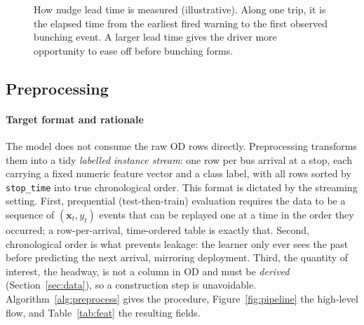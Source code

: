 \documentclass[final,5p,times,twocolumn,authoryear]{elsarticle}
\begin{document}
\begin{figure}[htbp]
\centering
{}
\caption{How nudge lead time is measured (illustrative). Along one trip, it is the elapsed time from
the earliest fired warning to the first observed bunching event. A larger lead time gives the driver
more opportunity to ease off before bunching forms.}
\label{fig:leadtime}
\end{figure}

\subsection{Preprocessing}
\label{sec:preprocessing}

\paragraph{Target format and rationale}
The model does not consume the raw OD rows directly. Preprocessing transforms them into a tidy
\emph{labelled instance stream}: one row per bus arrival at a stop, each carrying a fixed numeric
feature vector and a class label, with all rows sorted by \texttt{stop\_time} into true
chronological order. This format is dictated by the streaming setting. First, prequential
(test-then-train) evaluation requires the data to be a sequence of $(\mathbf{x}_t, y_t)$ events that
can be replayed one at a time in the order they occurred; a row-per-arrival, time-ordered table is
exactly that. Second, chronological order is what prevents leakage: the learner only ever sees the
past before predicting the next arrival, mirroring deployment. Third, the quantity of interest,
the headway, is not a column in OD and must be \emph{derived} (Section~\ref{sec:data}), so a
construction step is unavoidable. Algorithm~\ref{alg:preprocess} gives the procedure,
Figure~\ref{fig:pipeline} the high-level flow, and Table~\ref{tab:feat} the resulting fields.
\end{document}
